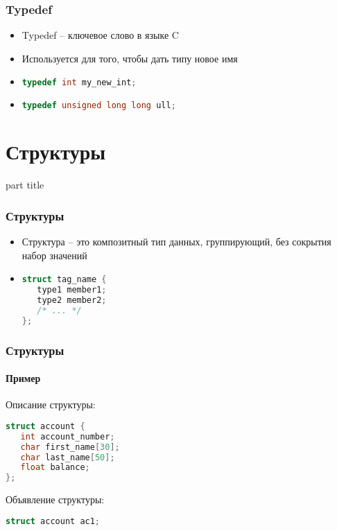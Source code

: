 \documentclass[14pt,pdf,hyperref={unicode}]{beamer}
\begin{document}
\begin{frame}[fragile]
\frametitle{Typedef} 
\begin{itemize}
\item Typedef -- ключевое слово в языке C \\
\item Используется для того, чтобы дать типу новое имя \\
\item 
\begin{lstlisting}[language=C++,basicstyle=\ttfamily,keywordstyle=\color{blue}]
typedef int my_new_int;
\end{lstlisting}
\item 
\begin{lstlisting}[language=C++,basicstyle=\ttfamily,keywordstyle=\color{blue}]
typedef unsigned long long ull;
\end{lstlisting}
\end{itemize}
\end{frame}




\section{Структуры}
\begin{frame}
\begin{center}
\begin{beamercolorbox}[sep=8pt,center]{part
title}
\insertsection
\end{beamercolorbox}
\end{center}
\end{frame}




\begin{frame}[fragile]
\frametitle{Структуры} 
\begin{itemize}
\item Структура -- это композитный тип данных, группирующий, без сокрытия набор значений \\
\item 
\begin{lstlisting}[language=C++,basicstyle=\ttfamily,keywordstyle=\color{blue}]
struct tag_name {
   type1 member1;
   type2 member2;
   /* ... */
};
\end{lstlisting}
\end{itemize}
\end{frame}


\begin{frame}[fragile]
\frametitle{Структуры} 
\framesubtitle{Пример} 
Описание структуры:
\begin{lstlisting}[language=C++,basicstyle=\ttfamily,keywordstyle=\color{blue}]
struct account {
   int account_number;
   char first_name[30];
   char last_name[50];
   float balance;
};
\end{lstlisting}
Объявление структуры:
\begin{lstlisting}[language=C++,basicstyle=\ttfamily,keywordstyle=\color{blue}]
struct account ac1;
\end{lstlisting}
\end{frame}
\end{document}
